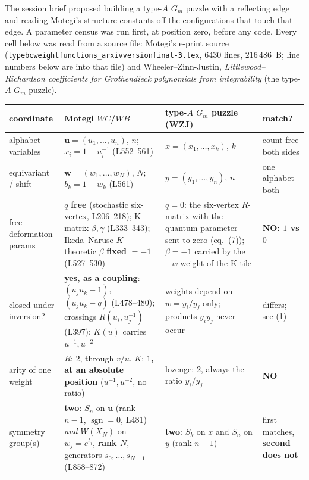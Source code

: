 \documentclass[11pt]{article}
\theoremstyle{plain}
\theoremstyle{definition}
\theoremstyle{remark}
\newcommand{\bu}{\mathbf{u}}
\newcommand{\bw}{\mathbf{w}}
\begin{document}
The session brief proposed building a type-$A$ $G_m$ puzzle with a reflecting
edge and reading Motegi's structure constants off the configurations that touch
that edge.  A parameter census was run first, at position zero, before any code.
Every cell below was read from a source file: Motegi's e-print source
(\texttt{typebcweightfunctions\_arxivversionfinal-3.tex}, $6430$ lines,
$216\,486$~B; line numbers below are into that file) and
Wheeler--Zinn-Justin, \emph{Littlewood--Richardson coefficients for Grothendieck
polynomials from integrability} (the type-$A$ $G_m$ puzzle).

\begin{center}\small
\begin{tabular}{p{3.1cm}p{4.6cm}p{4.2cm}p{1.9cm}}
\toprule
coordinate & Motegi $WC$/$WB$ & type-$A$ $G_m$ puzzle (WZJ) & match?\\
\midrule
alphabet variables
 & $\bu=(u_1,\dots,u_n)$, $n$; $x_i=1-u_i^{-1}$ (L552--561)
 & $x=(x_1,\dots,x_k)$, $k$
 & count free both sides\\
equivariant / shift
 & $\bw=(w_1,\dots,w_N)$, $N$; $b_k=1-w_k$ (L561)
 & $y=(y_1,\dots,y_n)$, $n$
 & one alphabet both\\
free deformation params
 & $q$ \textbf{free} (stochastic six-vertex, L206--218); K-matrix $\beta,\gamma$
   (L333--343); Ikeda--Naruse $K$-theoretic $\beta$ \textbf{fixed} $=-1$
   (L527--530)
 & \textbf{$q=0$}: the six-vertex $R$-matrix with the quantum parameter sent to
   zero (eq.~(7)); $\beta=-1$ carried by the $-w$ weight of the K-tile
 & \textbf{NO: $1$ vs $0$}\\
closed under inversion?
 & \textbf{yes, as a coupling}: $(u_ju_k-1)$, $(u_ju_k-q)$ (L478--480);
   crossings $R(u_i,u_j^{-1})$ (L397); $K(u)$ carries $u^{-1},u^{-2}$
 & weights depend on $w=y_i/y_j$ only; products $y_iy_j$ never occur
 & differs; see (1)\\
arity of one weight
 & $R$: $2$, through $v/u$. $K$: \textbf{$1$, at an absolute position}
   ($u^{-1},u^{-2}$, no ratio)
 & lozenge: $2$, always the ratio $y_i/y_j$
 & \textbf{NO}\\
symmetry group(s)
 & \textbf{two}: $S_n$ on $\bu$ (rank $n-1$, $\operatorname{sgn}=0$, L481)
   \emph{and} $W(X_N)$ on $w_j=e^{t_j}$, \textbf{rank $N$}, generators
   $s_0,\dots,s_{N-1}$ (L858--872)
 & \textbf{two}: $S_k$ on $x$ and $S_n$ on $y$ (rank $n-1$)
 & first matches, \textbf{second does not}\\
\bottomrule
\end{tabular}
\end{center}
\end{document}
